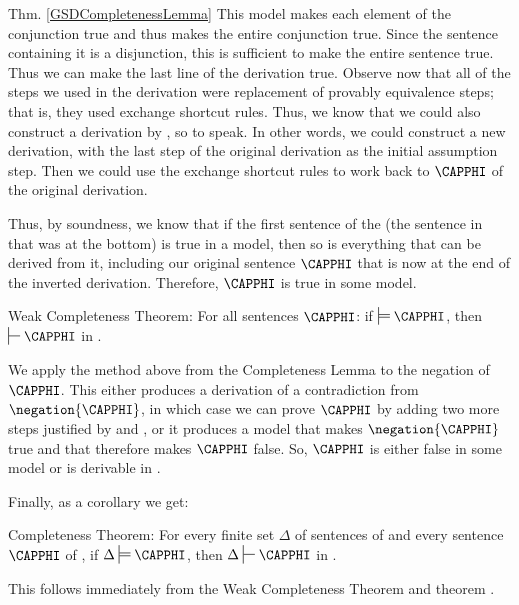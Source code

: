 \begin{PROOFOF}{Thm. \ref{GSDCompletenessLemma}}
This model makes each element of the conjunction true and thus makes the entire conjunction true. 
Since the sentence containing it is a disjunction, this is sufficient to make the entire sentence true.
Thus we can make the last line of the derivation true.
Observe now that all of the steps we used in the derivation were replacement of provably equivalence steps;
that is, they used exchange shortcut rules.
Thus, we know that we could also construct a derivation by , so to speak.  In other words, we could construct a new derivation, with the last step of the original derivation as the initial assumption step.  Then we could use the exchange shortcut rules to work back to $\CAPPHI$ of the original derivation.

Thus, by soundness, we know that if the first sentence of the  (the sentence in  that was at the bottom) is true in a model, then so is everything that can be derived from it, including our original sentence $\CAPPHI$ that is now at the end of the inverted derivation. 
Therefore, $\CAPPHI$ is true in some model. 
\end{PROOFOF}
\begin{THEOREM}{ Weak \GSD{} Completeness Theorem:}
For all \GSL{} sentences $\CAPPHI$: if $\sdtstile{}{}\CAPPHI$, then $\sststile{}{}\CAPPHI$ in \GSD{}.
\end{THEOREM}
\begin{PROOF}
We apply the method above from the \GSD{} Completeness Lemma to the negation of $\CAPPHI$. 
This either produces a derivation of a contradiction from $\negation{\CAPPHI}$, in which case we can prove $\CAPPHI$ by adding two more steps justified by  and , or it produces a model that makes $\negation{\CAPPHI}$ true and that therefore makes $\CAPPHI$ false. So, $\CAPPHI$ is either false in some model or is derivable in \GSD{}. 
\end{PROOF}
\noindent{}Finally, as a corollary we get:
\begin{THEOREM}{ \GSD{} Completeness Theorem:}
For every finite set $\Delta$ of sentences of \GSL{} and every sentence $\CAPPHI$ of \GSL{}, if $\Delta\sdtstile{}{}\CAPPHI$, then $\Delta\sststile{}{}\CAPPHI$ in \GSD{}.
\end{THEOREM}
\begin{PROOF}
This follows immediately from the Weak \GSD{} Completeness Theorem and theorem .
\end{PROOF}

